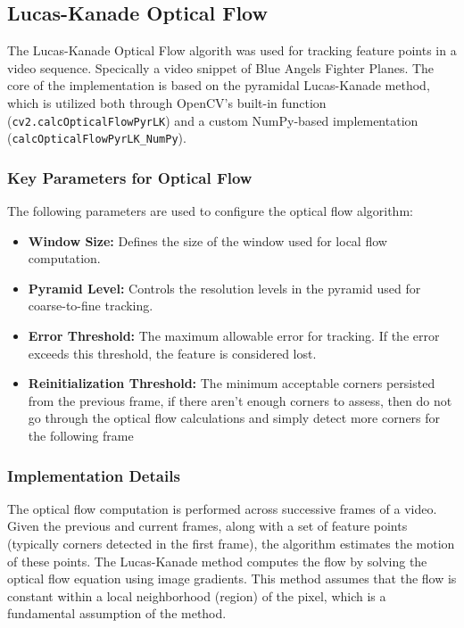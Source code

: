 \documentclass[11pt, conference, letterpaper]{IEEEtran}
\begin{document}

\subsection{Lucas-Kanade Optical Flow}

The Lucas-Kanade Optical Flow algorith was used for tracking feature points in a video sequence. Specically a video snippet of Blue Angels Fighter Planes. The core of the implementation is based on the pyramidal Lucas-Kanade method, which is utilized both through OpenCV's built-in function (\texttt{cv2.calcOpticalFlowPyrLK}) and a custom NumPy-based implementation (\texttt{calcOpticalFlowPyrLK\_NumPy}).

\subsubsection{Key Parameters for Optical Flow}
The following parameters are used to configure the optical flow algorithm:
\begin{itemize}
    \item \textbf{Window Size:} Defines the size of the window used for local flow computation.
    \item \textbf{Pyramid Level:} Controls the resolution levels in the pyramid used for coarse-to-fine tracking.
    \item \textbf{Error Threshold:} The maximum allowable error for tracking. If the error exceeds this threshold, the feature is considered lost.
    \item \textbf{Reinitialization Threshold:} The minimum acceptable corners persisted from the previous frame, if there aren't enough corners to assess, then do not go through the optical flow calculations and simply detect more corners for the following frame
\end{itemize}
\bigskip

\subsubsection{Implementation Details}
The optical flow computation is performed across successive frames of a video. Given the previous and current frames, along with a set of feature points (typically corners detected in the first frame), the algorithm estimates the motion of these points. The Lucas-Kanade method computes the flow by solving the optical flow equation using image gradients. This method assumes that the flow is constant within a local neighborhood (region) of the pixel, which is a fundamental assumption of the method.
\end{document}
